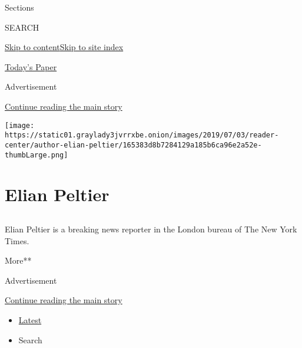 Sections

SEARCH

\protect\hyperlink{site-content}{Skip to
content}\protect\hyperlink{site-index}{Skip to site index}

\href{https://myaccount.nytimes3xbfgragh.onion/auth/login?response_type=cookie\&client_id=vi}{}

\href{https://www.nytimes3xbfgragh.onion/section/todayspaper}{Today's
Paper}

Advertisement

\protect\hyperlink{after-top}{Continue reading the main story}

\texttt{[image: https://static01.graylady3jvrrxbe.onion/images/2019/07/03/reader-center/author-elian-peltier/165383d8b7284129a185b6ca96e2a52e-thumbLarge.png]}

\hypertarget{elian-peltier}{%
\section{Elian Peltier}\label{elian-peltier}}

\subsection{}

Elian Peltier is a breaking news reporter in the London bureau of The
New York Times.

More**

Advertisement

\protect\hyperlink{after-mid1}{Continue reading the main story}

\begin{itemize}
\tightlist
\item
  \protect\hyperlink{stream-panel}{Latest}
\item
  Search
\end{itemize}

